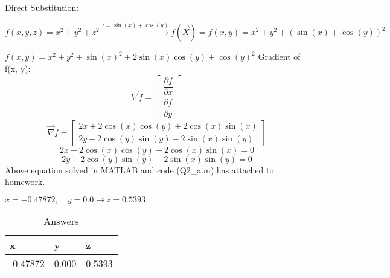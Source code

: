 Direct Substitution:


$f(x, y, z) = x^2 + y^2 + z^ 2 \xrightarrow{z = \sin(x) + \cos(y)}
f(\vec{X}) = f(x, y) = x^2 + y^2 + (\sin(x)+\cos(y))^2
$


$f(x, y) = x^2 + y^2 + \sin(x)^2 + 2\sin(x)\cos(y) + \cos(y)^2$
Gradient of f(x, y):
$$\vec{\nabla} f = \begin{bmatrix}
	\dfrac{\partial f}{\partial x} \\[6pt]
	\dfrac{\partial f}{\partial y}
\end{bmatrix} $$
$$\vec{\nabla} f = \begin{bmatrix}
	2x + 2\cos(x)\cos(y) + 2\cos(x)\sin(x) \\
	2y - 2\cos(y)\sin(y) - 2\sin(x)\sin(y)
\end{bmatrix} $$
$$	2x + 2\cos(x)\cos(y) + 2\cos(x)\sin(x)=  0 $$
$$2y - 2\cos(y)\sin(y) - 2\sin(x)\sin(y)= 0$$
Above equation solved in MATLAB and code (Q2\_a.m) has attached to homework.


$x = -0.47872, \quad y = 0.0 \to z = 0.5393 $
\begin{table}[H]
	\caption {Answers} \label{ans} 
	\begin{center}
		\begin{tabular}{| l | l | l |}
			\hline
			x & y & z \TBstrut \\
			\hline
			-0.47872 & 0.000 & 0.5393 \Tstrut\\
			\hline
		\end{tabular}
	\end{center}
\end{table}

